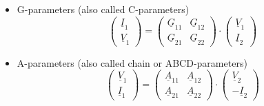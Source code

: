 \documentclass[10pt]{report}
\begin{document}
\begin{itemize}
\item G-parameters (also called C-parameters)
\begin{equation}
\begin{pmatrix}
\underline{I}_{1}\\
\underline{V}_{1}
\end{pmatrix}
=
\begin{pmatrix}
\underline{G}_{11} & \underline{G}_{12}\\
\underline{G}_{21} & \underline{G}_{22}
\end{pmatrix}
\cdot
\begin{pmatrix}
\underline{V}_{1}\\
\underline{I}_{2}
\end{pmatrix}
\end{equation}

\item A-parameters (also called chain or ABCD-parameters)
\begin{equation}
\begin{pmatrix}
\underline{V}_{1}\\
\underline{I}_{1}
\end{pmatrix}
=
\begin{pmatrix}
\underline{A}_{11} & \underline{A}_{12}\\
\underline{A}_{21} & \underline{A}_{22}
\end{pmatrix}
\cdot
\begin{pmatrix}
\underline{V}_{2}\\
-\underline{I}_{2}
\end{pmatrix}
\end{equation}

\end{itemize}
\end{document}
